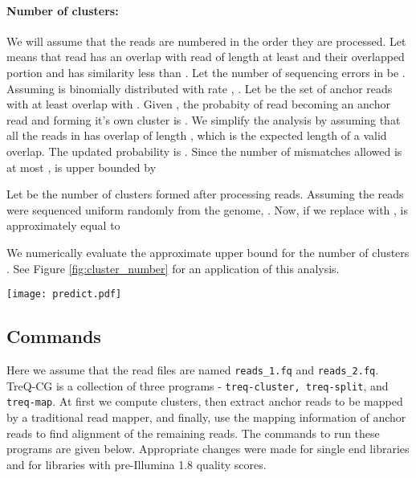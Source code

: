 \documentclass[a4paper]{article}
\begin{document}
\paragraph{Number of clusters:}
We will assume that the reads are numbered in the order they are processed.
Let  means that read  has an overlap with read  of 
length at least  and their overlapped portion  and  
has similarity less than . 
Let the number of sequencing errors in  be . Assuming
 is binomially distributed with rate , 
.
Let  be the set of 
anchor reads with at least  overlap with . 
Given , the probabity of read  becoming an anchor read and 
forming it's own cluster is 
.
We simplify the analysis by assuming that all the reads in 
 has overlap of length , which is the 
expected length of a valid overlap. The updated probability is 
.
Since the number of mismatches allowed is at most  
,  is upper bounded by

Let  be the number of clusters formed after processing  reads.
Assuming the reads were sequenced uniform randomly from the genome,
.
Now, if we replace  with ,  is approximately equal to


We numerically evaluate the approximate upper bound for the number of clusters
. See Figure \ref{fig:cluster_number} for an application
of this analysis.




\begin{figure*}
\begin{center}
\texttt{[image: predict.pdf]}
\end{center}
\caption{
{\bf Expected number of clusters.}
From an artificially generated sample genome,
an i.i.d. sequence of 1 million bases,
we sequence 100bp single-end reads with coverage 25, 50, and 100, and insert
sequencing error at a rate ranging from 0.005 to 0.09. 
We compare the true number of clusters computed using the clustering algorithm
to the numerically evaluated ones
for  and .
The total number of cluster is computed very
accurately except for small values of . 
It is evident that  
keeps the total number of clusters small.}
\label{fig:cluster_number}
\end{figure*}



\subsection*{Commands}

Here we assume that the read files are named {\tt reads\_1.fq} and {\tt reads\_2.fq}.
TreQ-CG is a collection of three programs - {\tt treq-cluster, treq-split}, and {\tt treq-map}. 
At first we compute clusters, then extract anchor reads to be mapped by a traditional
read mapper, and finally, use the mapping information of anchor reads to find alignment of the
remaining reads.
The commands to run these programs are given below. 
Appropriate changes were made for single end libraries and for libraries with pre-Illumina 1.8 quality scores.
\end{document}
